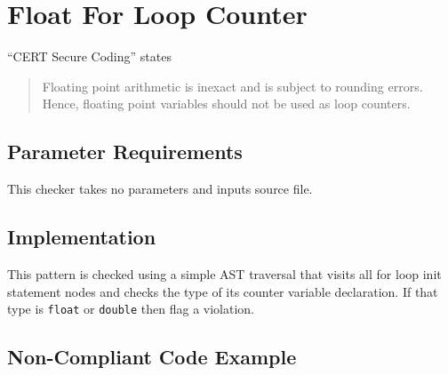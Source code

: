%
%

\section{Float For Loop Counter}
\label{FloatForLoopCounter::overview}
``CERT Secure Coding'' states
\begin{quote}
Floating point arithmetic is inexact and is subject to rounding errors. Hence, floating point variables should not be used as loop counters.
\end{quote}

\subsection{Parameter Requirements}
This checker takes no parameters and inputs source file.

\subsection{Implementation}
This pattern is checked using a simple AST traversal that visits all for loop init statement nodes and checks the type of its counter variable declaration. If that type is {\tt float} or {\tt double} then flag a violation.

\subsection{Non-Compliant Code Example}

